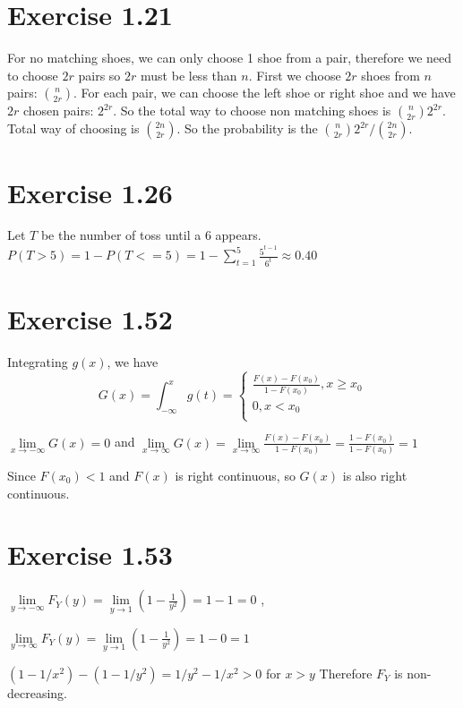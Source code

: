 \documentclass[12pt]{article}
\begin{document}
\section*{Exercise 1.21}
For no matching shoes, we can only choose 1 shoe from a pair, therefore we need to choose $2r$ pairs so $2r$ must be less than $n$. First we choose $2r$ shoes from $n$ pairs: ${n \choose 2r}$. For each pair, we can choose the left shoe or right shoe and we have $2r$ chosen pairs: $2^{2r}$. So the total way to choose non matching shoes is ${n \choose 2r} 2^{2r}$.  Total way of choosing is ${2n \choose 2r}$. So the probability is the ${n \choose 2r} 2^{2r} / {2n \choose 2r}$.

\section*{Exercise 1.26}
Let $T$ be the number of toss until a $6$ appears.
$P(T > 5) = 1- P(T <= 5) = 1 - \sum_{t=1}^5 \frac{5^{t-1}}{6^t} \approx 0.40$

\section*{Exercise 1.52}
Integrating $g(x)$, we have
\begin{equation*}
 G(x) = \int_{-\infty}^x g(t) = \begin{cases}
       \frac{F(x) - F(x_0)}{1-F(x_0)}, x \geq x_0 \\
       0, x < x_0 \\
     \end{cases}
\end{equation*}

$\lim\limits_{x \rightarrow -\infty} G(x) = 0$ and $\lim\limits_{x \rightarrow \infty} G(x) = \lim\limits_{x \rightarrow \infty} \frac{F(x) - F(x_0)}{1-F(x_0)} = \frac{1 - F(x_0)}{1-F(x_0)} = 1 $

Since $F(x_0)<1$ and $F(x)$ is right continuous, so $G(x)$ is also right continuous.


\section*{Exercise 1.53}
$\lim\limits_{y\rightarrow -\infty}F_Y(y) = \lim\limits_{y\rightarrow 1} (1- \frac{1}{y^2}) = 1 -1 = 0$ , 

$\lim\limits_{y\rightarrow \infty}F_Y(y) = \lim\limits_{y\rightarrow 1} (1- \frac{1}{y^2}) = 1 - 0 = 1$ 

$ (1 - 1/x^2) - (1 - 1/y^2) = 1/y^2 - 1/x^2 > 0 $ for $ x > y$ Therefore $F_Y$ is non-decreasing.
\end{document}
